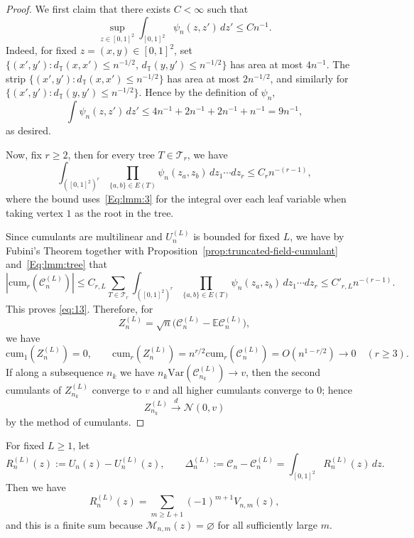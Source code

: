\documentclass[11pt]{article}
\newcommand{\var}{\mathrm{Var}}
\begin{document}
\begin{proof}

We first claim that there exists $C<\infty$ such that
\begin{equation}
    \label{Eq:lmm:3}
\sup_{z\in[0,1]^2}\int_{[0,1]^2}\psi_n(z,z')\,dz' \le Cn^{-1}.
\end{equation}
Indeed, for fixed $z = (x,y) \in [0, 1]^2$, set $\{(x', y'): d_{\mathbb{T}}(x, x') \leq n^{-1/2}, \,d_{\mathbb{T}}(y, y') \leq n^{-1/2}\}$ has area at most $4n^{-1}$. The strip
$\{(x', y'): d_{\mathbb{T}}(x, x') \leq n^{-1/2}\}$ has area at most $2n^{-1/2}$, and similarly for $\{(x', y'): d_{\mathbb{T}}(y, y') \leq n^{-1/2}\}$. Hence by the definition of $\psi_n$,
\[
\int\psi_n(z,z')\,dz'
\le
4n^{-1} + 2n^{-1} + 2n^{-1} + n^{-1}
=
9n^{-1},
\]
as desired. 

Now, fix $r\ge2$, then for every tree $T\in\mathcal T_r$, we have 
\begin{equation}
    \label{Eq:lmm:tree}
\int_{([0,1]^2)^r}
\prod_{\{a,b\}\in E(T)} \psi_n(z_a,z_b)
\,dz_1\cdots dz_r
\le
C_r n^{-(r-1)},
\end{equation}
where the bound uses~\eqref{Eq:lmm:3} for the integral over each leaf variable when taking vertex $1$ as the root in the tree. 

Since cumulants are multilinear and $U_n^{(L)}$ is bounded for fixed $L$, we have by Fubini's Theorem together with Proposition~\ref{prop:truncated-field-cumulant} and~\eqref{Eq:lmm:tree} that
\[
|\mathrm{cum}_r(\mathscr{C}_n^{(L)})|
\le
C_{r,L}
\sum_{T\in\mathcal T_r}
\int_{([0,1]^2)^r}
\prod_{\{a,b\}\in E(T)} \psi_n(z_a,z_b)
\,dz_1\cdots dz_r
\le
C'_{r,L} n^{-(r-1)}.
\]
This proves \eqref{eq:13}. Therefore, for
\[
Z_n^{(L)}=\sqrt n \bigl(\mathscr{C}_n^{(L)}-\mathbb{E} \mathscr{C}_n^{(L)}\bigr),
\]
we have
\[
\mathrm{cum}_1(Z_n^{(L)})=0,
\qquad
\mathrm{cum}_r(Z_n^{(L)}) = n^{r/2}\mathrm{cum}_r(\mathscr{C}_n^{(L)}) = O\!\left(n^{1-r/2}\right)\to0
\quad (r\ge3).
\]
If along a subsequence $n_k$ we have $n_k\var(\mathscr{C}_{n_k}^{(L)})\to v$, then the second cumulants
of $Z_{n_k}^{(L)}$ converge to $v$ and all higher cumulants converge to $0$; hence
\[
Z_{n_k}^{(L)} \xrightarrow{d} \mathcal{N}(0,v)
\]
by the method of cumulants.
\end{proof}

For fixed $L\ge1$, let
\[
R_n^{(L)}(z) := U_n(z) - U_n^{(L)}(z),\qquad
\Delta_n^{(L)} := \mathscr{C}_n - \mathscr{C}_n^{(L)} = \int_{[0,1]^2} R_n^{(L)}(z)\,dz.
\]
Then we have
\[
R_n^{(L)}(z)=\sum_{m\ge L+1}(-1)^{m+1}V_{n,m}(z),
\]
and this is a finite sum because $\mathcal M_{n,m}(z)=\varnothing$ for all sufficiently large $m$.
\end{document}
